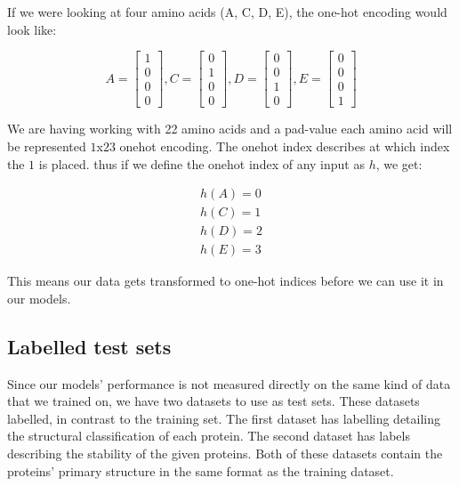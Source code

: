 \noindent
If we were looking at four amino acids (A, C, D, E), the one-hot encoding would look like:

$$
A = \begin{bmatrix}
1 \\
0 \\
0 \\
0
\end{bmatrix},
C = \begin{bmatrix}
0 \\
1 \\
0 \\
0
\end{bmatrix},
D= \begin{bmatrix}
0 \\
0 \\
1 \\
0
\end{bmatrix},
E= \begin{bmatrix}
0 \\
0 \\
0 \\
1
\end{bmatrix}
$$

\noindent
We are having working with 22 amino acids and a pad-value each amino acid will be represented $1$x$23$ onehot encoding. The onehot index describes at which index the $1$ is placed. thus if we define the onehot index of any input as $h$, we get:

\begin{align}
h(A) = 0 \\
h(C) = 1 \\
h(D) = 2 \\
h(E) = 3
\end{align}

\noindent
This means our data gets transformed to one-hot indices before we can use it in our models.

\subsection{Labelled test sets}
Since our models' performance is not measured directly on the same kind of data that we trained on, we have two datasets to use as test sets. These datasets labelled, in contrast to the training set. The first dataset has labelling detailing the structural classification of each protein.\cite{scope} The second dataset has labels describing the stability of the given proteins.\cite{stability} Both of these datasets contain the proteins' primary structure in the same format as the training dataset.\\

